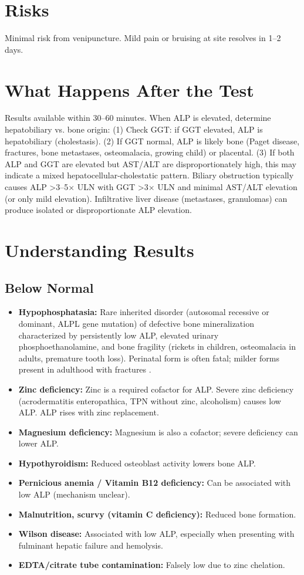 \section*{Risks}
Minimal risk from venipuncture. Mild pain or bruising at site resolves in 1--2 days.

\section*{What Happens After the Test}
Results available within 30--60 minutes. When ALP is elevated, determine hepatobiliary vs. bone origin: (1) Check GGT: if GGT elevated, ALP is hepatobiliary (cholestasis). (2) If GGT normal, ALP is likely bone (Paget disease, fractures, bone metastases, osteomalacia, growing child) or placental. (3) If both ALP and GGT are elevated but AST/ALT are disproportionately high, this may indicate a mixed hepatocellular-cholestatic pattern. Biliary obstruction typically causes ALP >3--5$\times$ ULN with GGT >3$\times$ ULN and minimal AST/ALT elevation (or only mild elevation). Infiltrative liver disease (metastases, granulomas) can produce isolated or disproportionate ALP elevation.

\section*{Understanding Results}

\subsection*{Below Normal}
\begin{itemize}
  \item \textbf{Hypophosphatasia:} Rare inherited disorder (autosomal recessive or dominant, ALPL gene mutation) of defective bone mineralization characterized by persistently low ALP, elevated urinary phosphoethanolamine, and bone fragility (rickets in children, osteomalacia in adults, premature tooth loss). Perinatal form is often fatal; milder forms present in adulthood with fractures \cite{whyte2016hypophosphatasia}.
  \item \textbf{Zinc deficiency:} Zinc is a required cofactor for ALP. Severe zinc deficiency (acrodermatitis enteropathica, TPN without zinc, alcoholism) causes low ALP. ALP rises with zinc replacement.
  \item \textbf{Magnesium deficiency:} Magnesium is also a cofactor; severe deficiency can lower ALP.
  \item \textbf{Hypothyroidism:} Reduced osteoblast activity lowers bone ALP.
  \item \textbf{Pernicious anemia / Vitamin B12 deficiency:} Can be associated with low ALP (mechanism unclear).
  \item \textbf{Malnutrition, scurvy (vitamin C deficiency):} Reduced bone formation.
  \item \textbf{Wilson disease:} Associated with low ALP, especially when presenting with fulminant hepatic failure and hemolysis.
  \item \textbf{EDTA/citrate tube contamination:} Falsely low due to zinc chelation.
\end{itemize}


